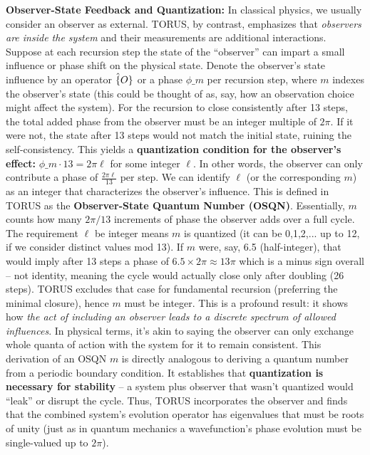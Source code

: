 \documentclass[]{article}
\begin{document}
\textbf{Observer-State Feedback and Quantization:} In classical physics,
we usually consider an observer as external. TORUS, by contrast,
emphasizes that \emph{observers are inside the system} and their
measurements are additional interactions. Suppose at each recursion step
the state of the ``observer'' can impart a small influence or phase
shift on the physical state​. Denote the observer's state influence by
an operator $\hat\{O\}$ or a phase
$\phi\_m$ per recursion step, where $m$ indexes the
observer's state (this could be thought of as, say, how an observation
choice might affect the system). For the recursion to close consistently
after 13 steps, the total added phase from the observer must be an
integer multiple of $2\pi$. If it were not, the state
after 13 steps would not match the initial state, ruining the
self-consistency​. This yields a \textbf{quantization condition for the
observer's effect:} $\phi\_m \cdot 13 =
2\pi \ell$ for some integer
$\ell$​. In other words, the observer can only
contribute a phase of $\frac{2\pi
\ell}{13}$ per step. We can identify
$\ell$ (or the corresponding $m$) as an integer that
characterizes the observer's influence. This is defined in TORUS as the
\textbf{Observer-State Quantum Number (OSQN)}​. Essentially, $m$
counts how many $2\pi/13$ increments of phase the
observer adds over a full cycle. The requirement $\ell$
be integer means $m$ is quantized (it can be 0,1,2,... up to 12, if we
consider distinct values mod 13). If $m$ were, say, 6.5
(half-integer), that would imply after 13 steps a phase of $6.5
\times 2\pi \approx
13\pi$ which is a minus sign overall -- not identity,
meaning the cycle would actually close only after doubling (26 steps)​.
TORUS excludes that case for fundamental recursion (preferring the
minimal closure), hence $m$ must be integer​. This is a profound
result: it shows how \emph{the act of including an observer leads to a
discrete spectrum of allowed influences}. In physical terms, it's akin
to saying the observer can only exchange whole quanta of action with the
system for it to remain consistent. This derivation of an OSQN $m$ is
directly analogous to deriving a quantum number from a periodic boundary
condition​. It establishes that \textbf{quantization is necessary for
stability} -- a system plus observer that wasn't quantized would
``leak'' or disrupt the cycle. Thus, TORUS incorporates the observer and
finds that the combined system's evolution operator has eigenvalues that
must be roots of unity (just as in quantum mechanics a wavefunction's
phase evolution must be single-valued up to $2\pi$).
\end{document}
